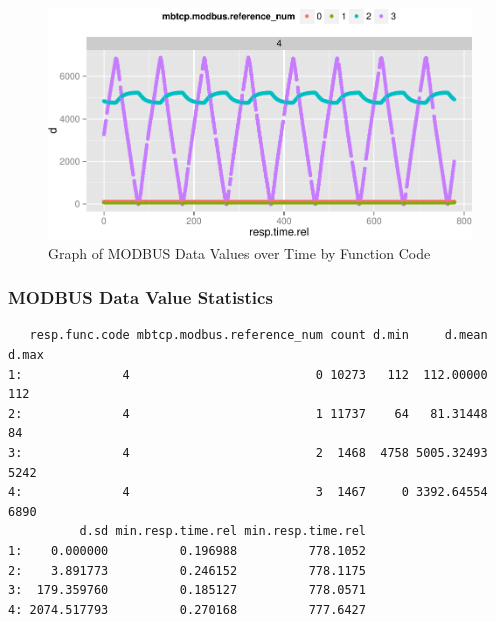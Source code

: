 \documentclass[12pt,]{article}
\begin{document}
\begin{figure}

{\centering \includegraphics{thesis_files/figure-latex/unnamed-chunk-27-1} 

}

\caption{Graph of MODBUS Data Values over Time by Function Code}\label{fig:unnamed-chunk-27}
\end{figure}

\subsubsection{MODBUS Data Value
Statistics}\label{modbus-data-value-statistics}

\begin{verbatim}
   resp.func.code mbtcp.modbus.reference_num count d.min     d.mean d.max
1:              4                          0 10273   112  112.00000   112
2:              4                          1 11737    64   81.31448    84
3:              4                          2  1468  4758 5005.32493  5242
4:              4                          3  1467     0 3392.64554  6890
          d.sd min.resp.time.rel min.resp.time.rel
1:    0.000000          0.196988          778.1052
2:    3.891773          0.246152          778.1175
3:  179.359760          0.185127          778.0571
4: 2074.517793          0.270168          777.6427
\end{verbatim}
\end{document}
